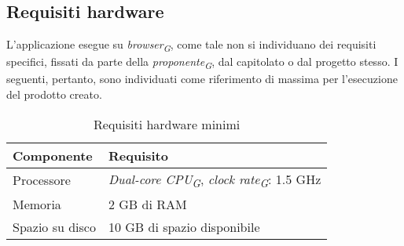 \subsection{Requisiti hardware}
L’applicazione esegue su \textit{browser}\textsubscript{\textit{G}}, come tale non si individuano dei requisiti specifici, fissati da parte
della \textit{proponente}\textsubscript{\textit{G}}, dal capitolato o dal progetto stesso. I seguenti, pertanto, sono individuati come
riferimento di massima per l’esecuzione del prodotto creato.   
\begin{table}[H]
    \centering
    \begin{tabular}{ll}
        \toprule
        \textbf{Componente} & \textbf{Requisito} \\
        \midrule
        Processore & \textit{Dual-core CPU}\textsubscript{\textit{G}}, \textit{clock rate}\textsubscript{\textit{G}}: 1.5 GHz \\
        Memoria & 2 GB di RAM \\
        Spazio su disco & 10 GB di spazio disponibile\\
        \bottomrule
    \end{tabular}
    \caption{Requisiti hardware minimi}
\end{table} 